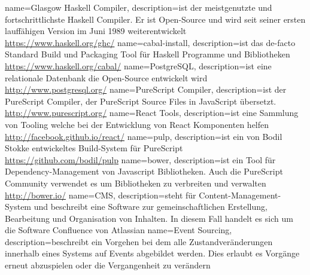 {
  name=Glasgow Haskell Compiler,
  description={ist der meistgenutzte und fortschrittlichste Haskell Compiler.
    Er ist Open-Source und wird seit seiner ersten lauffähigen Version im Juni 1989 weiterentwickelt\\
    \url{https://www.haskell.org/ghc/}
  }
}
{
  name=cabal-install,
  description={ist das de-facto Standard Build und Packaging Tool für Haskell Programme und Bibliotheken\\
    \url{https://www.haskell.org/cabal/}
  }
}
{
  name=PostgreSQL,
  description={ist eine relationale Datenbank die Open-Source entwickelt wird\\
    \url{http://www.postgresql.org/}
  }
}
{
  name=PureScript Compiler,
  description={ist der PureScript Compiler, der PureScript Source Files in JavaScript übersetzt.\\
    \url{http://www.purescript.org/}
  }
}
{
  name=React Tools,
  description={ist eine Sammlung von Tooling welche bei der Entwicklung von React Komponenten helfen\\
    \url{http://facebook.github.io/react/}
  }
}
{
  name=pulp,
  description={ist ein von Bodil Stokke entwickeltes Build-System für PureScript\\
    \url{https://github.com/bodil/pulp}
  }
}
{
  name=bower,
  description={ist ein Tool für Dependency-Management von Javascript Bibliotheken. Auch die PureScript Community
    verwendet es um Bibliotheken zu verbreiten und verwalten\\
    \url{http://bower.io/}
  }
}
{
  name=CMS,
  description={steht für Content-Management-System und beschreibt eine Software zur gemeinschaftlichen
    Erstellung, Bearbeitung und Organisation von Inhalten. In diesem Fall handelt es sich um die Software
    Confluence von Atlassian
  }
}
{
  name=Event Sourcing,
  description={beschreibt ein Vorgehen bei dem alle Zustandveränderungen
    innerhalb eines Systems auf Events abgebildet werden. Dies erlaubt es Vorgänge
    erneut abzuspielen oder die Vergangenheit zu verändern
  }
}

